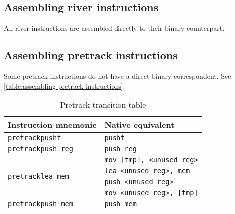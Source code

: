 \documentclass[12pt]{report}
\begin{document}
\subsection{Assembling river instructions}
All river instructions are assembled directly to their binary counterpart.\\

\subsection{Assembling pretrack instructions}
Some pretrack instructions do not have a direct binary correspondent. See \autoref{table:assembling-pretrack-instructions}.\\
\begin{table}[h]
	\centering
	\begin{tabular}{| l | l |}
		\hline
		\textbf{Instruction mnemonic}			  & \textbf{Native equivalent}\\ \hline
		\texttt{pretrackpushf}					  &	\texttt{pushf}\\ \hline
		\texttt{pretrackpush reg}			      & \texttt{push reg}\\ \hline
		\multirow{4}{*}{\texttt{pretracklea mem}} & \texttt{mov [tmp], <unused_reg>}\\
												  & \texttt{lea <unused_reg>, mem}\\
												  & \texttt{push <unused_reg>}\\
												  & \texttt{mov <unused_reg>, [tmp]}\\ \hline
		\texttt{pretrackpush mem}				  & \texttt{push mem}\\ \hline
	\end{tabular}
	\caption{Pretrack transition table}
	\label{table:assembling-pretrack-instructions}
\end{table}
\end{document}
